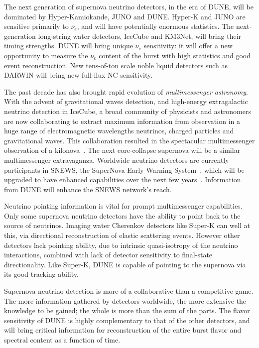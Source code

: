 The next generation of supernova neutrino detectors, in the era of
DUNE, will be dominated by Hyper-Kamiokande, JUNO and DUNE.  Hyper-K
and JUNO are sensitive primarily to $\bar{\nu}_e$, and will have
potentially enormous statistics.  The next-generation long-string
water detectors, IceCube and KM3Net, will bring their timing
strengths.  DUNE will bring unique $\nu_e$ sensitivity: it will offer
a new opportunity to measure the $\nu_e$ content of the burst with
high statistics and good event reconstruction.  New tens-of-ton scale
noble liquid detectors such as DARWIN will bring new full-flux NC
sensitivity.

The past decade has also brought rapid evolution of
\textit{multimessenger astronomy}.  With the advent of gravitational
waves detection, and high-energy extragalactic neutrino detection in
IceCube, a broad community of physicists and astronomers are now
collaborating to extract maximum information from observation in a
huge range of electromagnetic wavelengths neutrinos, charged particles
and gravitational waves.  This collaboration resulted in the
spectacular multimessenger observation of a kilonova~\cite{blah}.  The
next core-collapse supernova will be a similar multimessenger
extravaganza.  Worldwide neutrino detectors are currently participants
in SNEWS, the SuperNova Early Warning System~\cite{}, which will be
upgraded to have enhanced capabilities over the next few
years~\cite{snews2.0}.  Information from DUNE will enhance the SNEWS
network's reach.

Neutrino pointing information is vital for prompt multimessenger
capabilities.  Only some supernova neutrino detectors have the ability
to point back to the source of neutrinos.  Imaging water Cherenkov
detectors like Super-K can well at this, via directional
reconstruction of elastic scattering events. However other detectors
lack pointing ability, due to intrinsic quasi-isotropy of the neutrino
interactions, combined with lack of detector sensitivity to
final-state directionality.  Like Super-K, DUNE is capable of pointing
to the supernova via its good tracking ability.

Supernova neutrino detection is more of a collaborative than a
competitive game.  The more information gathered by detectors
worldwide, the more extensive the knowledge to be gained; the whole is
more than the sum of the parts.  The flavor sensitivity of DUNE is
highly complementary to that of the other detectors, and will bring
critical information for reconstruction of the entire burst flavor and
spectral content as a function of time.

